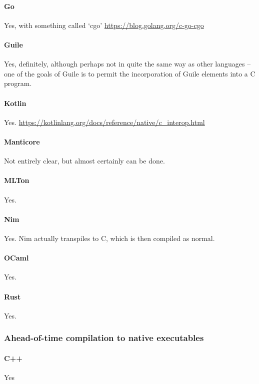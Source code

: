 \paragraph{Go}
Yes, with something called `cgo' \url{https://blog.golang.org/c-go-cgo}

\paragraph{Guile}
Yes, definitely, although perhaps not in quite the same way as other languages -- one of the goals of Guile is to permit the incorporation of Guile elements into a C program.

\paragraph{Kotlin}
Yes. \url{https://kotlinlang.org/docs/reference/native/c_interop.html}

\paragraph{Manticore}
Not entirely clear, but almost certainly can be done.

\paragraph{MLTon}
Yes.

\paragraph{Nim}
Yes.  Nim actually transpiles to C, which is then compiled as normal.

\paragraph{OCaml}
Yes.

\paragraph{Rust}
Yes.


\subsubsection{Ahead-of-time compilation to native executables}

\paragraph{C++}
Yes

